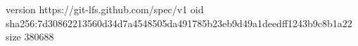 version https://git-lfs.github.com/spec/v1
oid sha256:7d30862213560d34d7a4548505da491785b23eb9d49a1deedff1243b9c8b1a22
size 380688
